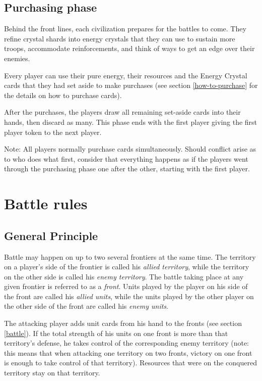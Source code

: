 \documentclass[a4paper]{article}
\begin{document}
    
    \subsection{Purchasing phase}
        \label{purchase}
        Behind the front lines, each civilization prepares for the battles to come.
        They refine crystal shards into energy crystals that they can use to
        sustain more troops, accommodate reinforcements,
        and think of ways to get an edge over their enemies.
        
        Every player can use their pure energy, their resources
        and the Energy Crystal cards that they had set aside to make purchases
        (see section \ref{how-to-purchase} for the details on how to purchase cards).
        
        After the purchases, the players draw all remaining set-aside cards into their
        hands, then discard as many.        
        This phase ends with the first player giving the first player token
        to the next player.
        
        Note: All players normally purchase cards simultaneously.
        Should conflict arise as to who does what first,
        consider that everything happens as if the players went through
        the purchasing phase one after the other, starting with the first player.


\newpage
\section{Battle rules}
    \label{battle-rules}
    
    \subsection{General Principle}
        Battle may happen on up to two several frontiers at the same time.
        The territory on a player's side of the frontier is called his \textit{allied territory},
        while the territory on the other side is called his \textit{enemy territory}.
        The battle taking place at any given frontier is referred to as a \textit{front}.
        Units played by the player on his side of the front are called his
        \textit{allied units}, while the units played by the other player on the other
        side of the front are called his \textit{enemy units}.
        
        The attacking player adds unit cards from his hand to the fronts
        (see section \ref{battle}).
        If the total strength of his units on one front is more than that territory's
        defense, he takes control of the corresponding enemy territory
        (note: this means that when attacking one territory on two fronts,
        victory on one front is enough to take control of that territory).
        Resources that were on the conquered territory stay on that territory.
        
\end{document}
